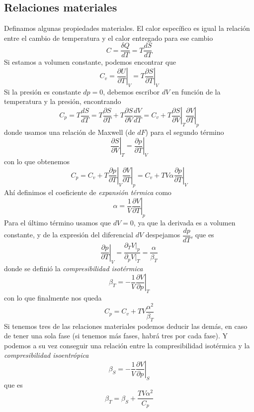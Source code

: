 \subsection{Relaciones materiales}
Definamos algunas propiedades materiales. El calor específico es igual la relación entre el cambio de temperatura y el calor entregado para ese cambio
\begin{equation}
C = \frac{\delta Q}{d T} = T \frac{dS}{dT}
\end{equation}
Si estamos a volumen constante, podemos encontrar que
\begin{equation}
C_v = \left.\frac{\partial U}{\partial T}\right|_V = T \left.\frac{\partial S}{\partial T}\right|_V
\label{eq:cv}
\end{equation}
Si la presión es constante $dp = 0$, debemos escribor $dV$ en función de la temperatura y la presión, encontrando
\[C_p = T \frac{dS}{dT} = T \frac{\partial S}{\partial T} + T \frac{\partial S}{\partial V} \frac{dV}{dT} = C_v + T \left.\frac{\partial S}{\partial V}\right|_T \left.\frac{\partial V}{\partial T}\right|_p\]
donde usamos una relación de Maxwell (de $dF$) para el segundo término
\[\left.\frac{\partial S}{\partial V}\right|_T = \left.\frac{\partial p}{\partial T}\right|_V\]
con lo que obtenemos
\[C_p = C_v + T \left.\frac{\partial p}{\partial T}\right|_V \left.\frac{\partial V}{\partial T}\right|_p = C_v + T V \alpha \left.\frac{\partial p}{\partial T}\right|_V\]
Ahí definimos el coeficiente de \emph{expansión térmica} como
\begin{equation}
\alpha = \frac{1}{V} \left.\frac{\partial V}{\partial T}\right|_p
\end{equation}
Para el último término usamos que $dV = 0$, ya que la derivada es a volumen constante, y de la expresión del diferencial $dV$ despejamos $\dfrac{dp}{dT}$, que es
\[ \left.\frac{\partial p}{\partial T}\right|_V = \frac{\partial_T V |_p}{\partial_p V|_T} = \frac{\alpha}{\beta_T}\]
donde se definió la \emph{compresibilidad isotérmica}
\begin{equation}
\beta_T = - \frac{1}{V} \left.\frac{\partial V}{\partial p}\right|_T
\end{equation}
con lo que finalmente nos queda
\begin{equation}
C_p = C_v + T V \frac{\alpha^2}{\beta_T}
\end{equation}
Si tenemos tres de las relaciones materiales podemos deducir las demás, en caso de tener una sola fase (si tenemos más fases, habrá tres por cada fase).
Y podemos a su vez conseguir una relación entre la compresibilidad isotérmica y la \emph{compresibilidad isoentrópica}
\begin{equation}
\beta_S = - \frac{1}{V} \left. \frac{\partial V}{\partial p}\right|_S
\end{equation}
que es
\begin{equation}
\beta_T = \beta_S + \frac{T V \alpha^2}{C_p}
\end{equation}
